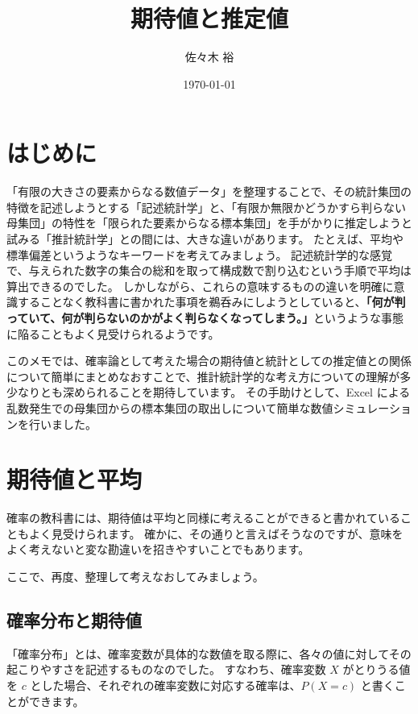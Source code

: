 \documentclass[uplatex,11pt,a4paper]{jsarticle}
\title{期待値と推定値}
\author{佐々木 裕}
\date{\today}
\begin{document}
\maketitle

\tableofcontents

\newpage

\setcounter{secnumdepth}{4}


\section*{はじめに}

「有限の大きさの要素からなる数値データ」を整理することで、その統計集団の特徴を記述しようとする「記述統計学」と、「有限か無限かどうかすら判らない母集団」の特性を「限られた要素からなる標本集団」を手がかりに推定しようと試みる「推計統計学」との間には、大きな違いがあります。
たとえば、平均や標準偏差というようなキーワードを考えてみましょう。
記述統計学的な感覚で、与えられた数字の集合の総和を取って構成数で割り込むという手順で平均は算出できるのでした。
しかしながら、これらの意味するものの違いを明確に意識することなく教科書に書かれた事項を鵜呑みにしようとしていると、{\bf 「何が判っていて、何が判らないのかがよく判らなくなってしまう。」}というような事態に陥ることもよく見受けられるようです。

このメモでは、確率論として考えた場合の期待値と統計としての推定値との関係について簡単にまとめなおすことで、推計統計学的な考え方についての理解が多少なりとも深められることを期待しています。
その手助けとして、Excel による乱数発生での母集団からの標本集団の取出しについて簡単な数値シミュレーションを行いました。

\newpage

\section{期待値と平均}

確率の教科書には、期待値は平均と同様に考えることができると書かれていることもよく見受けられます。
確かに、その通りと言えばそうなのですが、意味をよく考えないと変な勘違いを招きやすいことでもあります。

ここで、再度、整理して考えなおしてみましょう。


\subsection{確率分布と期待値}


「確率分布」とは、確率変数が具体的な数値を取る際に、各々の値に対してその起こりやすさを記述するものなのでした。
すなわち、確率変数 $X$ がとりうる値を $c$ とした場合、それぞれの確率変数に対応する確率は、$P(X=c)$ と書くことができます。
\end{document}
